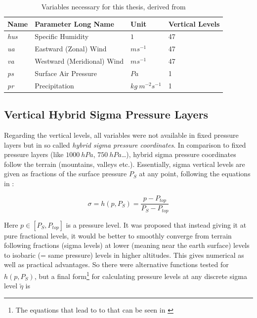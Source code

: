 \begin{table}[bht]
\centering
\caption{Variables necessary for this thesis, derived from \cite{olonscheck_new_2023}}
\begin{tabular}{l|l|l|l}
  \label{tab:thesisVariables}
\textbf{Name} & \textbf{Parameter Long Name} & \textbf{Unit}                & \multicolumn{1}{l}{\textbf{Vertical Levels}}  \\ 
\hline
\textit{hus}              & Specific Humidity            & $1$                        & 47                                            \\
\textit{ua}               & Eastward (Zonal) Wind        & $ms^{-1}$              & 47                                            \\
\textit{va}               & Westward (Meridional) Wind   & $ms^{-1}$              & 47                                            \\
\textit{ps}               & Surface Air Pressure         & $Pa$                           & 1                                             \\
\textit{pr}               & Precipitation                & $kg~m^{-2} s^{-1}$ & 1                                            
\end{tabular}
\end{table}


\subsection{Vertical Hybrid Sigma Pressure Layers}
\label{sec:hybridsigma}

Regarding the vertical levels, all variables were not available in fixed pressure layers but in so called \textit{hybrid sigma pressure coordinates}. 
In comparison to fixed pressure layers (like $1000 ~hPa$, $750 ~hPa$\dots), hybrid sigma pressure coordinates follow the terrain (mountains, valleys etc.). 
Essentially, sigma vertical levels are given as fractions of the surface pressure $P_S$ at any point, following the equations in \cite{eckermann_hybrid_2009}: 

\begin{equation}
\label{eq:sigma-definition}
\sigma = h(p,P_S) = \frac{p - P_{top}}{P_S - P_{top}}
\end{equation}

Here $p \in [P_S, P_{top}]$ is a pressure level. 
It was proposed that instead giving it at pure fractional levels, it would be better to smoothly converge from terrain following fractions (sigma levels) at lower (meaning near the earth surface) levels to isobaric (= same pressure) levels in higher altitudes. 
This gives numerical as well as practical advantages.
So there were alternative functions tested for $h(p, P_S)$, but a final form\footnote{The equations that lead to to that can be seen in \cite{eckermann_hybrid_2009}} for calculating pressure levels at any discrete sigma level $\tilde{\eta}$ is

